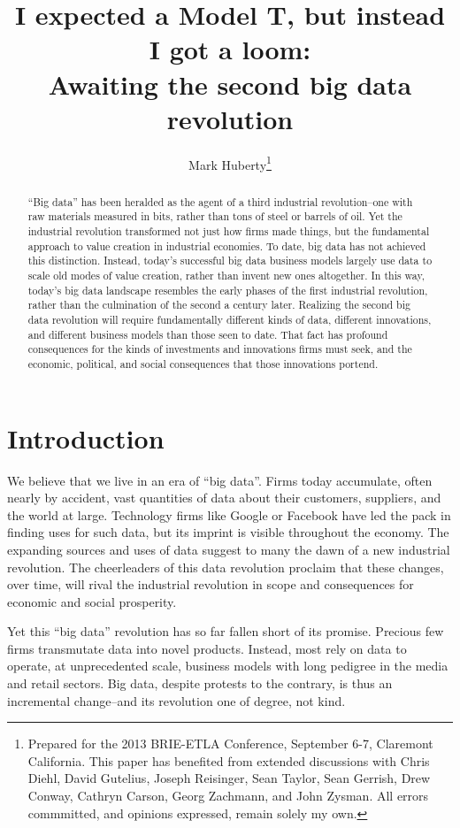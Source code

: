 \documentclass[12pt]{article}
\title{I expected a Model T, but instead I got a loom:\\ Awaiting the second big data revolution}
\author{Mark Huberty\thanks{Prepared for the 2013 BRIE-ETLA
    Conference, September 6-7, Claremont California. This paper has
    benefited from extended discussions with Chris Diehl, David
    Gutelius, Joseph Reisinger, Sean Taylor, Sean Gerrish, Drew
    Conway, Cathryn Carson, Georg Zachmann, and John
    Zysman. All errors commmitted, and opinions expressed, remain
    solely my own.}}
\begin{document}
\maketitle
\begin{abstract}
``Big data'' has been heralded as the agent of a third industrial
revolution--one with raw materials measured in bits, rather than tons
of steel or barrels of oil. Yet the industrial revolution transformed not just how
firms made things, but the fundamental approach to value creation in
industrial economies. To date, big data has not achieved this
distinction. Instead, today's successful big data business models
largely use data to scale old modes of value creation, rather than
invent new ones altogether. In this way, today's big data landscape
resembles the early phases of the first industrial revolution, rather
than the culmination of the second a century later. Realizing the
second big data revolution will require fundamentally different kinds
of data, different innovations, and different business models than
those seen to date. That fact has profound consequences for the kinds
of investments and innovations firms must seek, and the economic,
political, and social consequences that those innovations portend.
\end{abstract}


\section{Introduction}
\label{sec:introduction}

We believe that we live in an era of ``big data''. Firms today
accumulate, often nearly by accident, vast quantities of data about
their customers, suppliers, and the world at large. Technology firms
like Google or Facebook have led the pack in finding uses for such
data, but its imprint is visible throughout the economy. The expanding
sources and uses of data suggest to many the dawn of a new industrial
revolution. The cheerleaders of this data revolution proclaim that
these changes, over time, will rival the industrial revolution in
scope and consequences for economic and social prosperity.

Yet this ``big data'' revolution has so far fallen short of its
promise. Precious few firms transmutate data into novel
products. Instead, most rely on data to operate, at unprecedented
scale, business models with long pedigree in the media and retail
sectors. Big data, despite protests to the contrary, is thus an
incremental change--and its revolution one of degree, not kind. 
\end{document}

